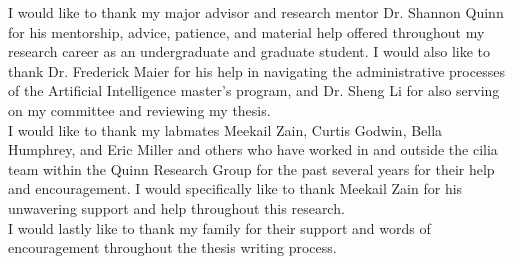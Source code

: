 \documentclass[./dissertation.tex]{subfiles}
\begin{document}
  
  I would like to thank my major advisor and research mentor Dr. Shannon Quinn for his mentorship, advice, patience, and material help offered throughout my research career as an undergraduate and graduate student. I would also like to thank Dr. Frederick Maier for his help in navigating the administrative processes of the Artificial Intelligence master's program, and Dr. Sheng Li for also serving on my committee and reviewing my thesis. \\
  
  I would like to thank my labmates Meekail Zain, Curtis Godwin, Bella Humphrey, and Eric Miller and others who have worked in and outside the cilia team within the Quinn Research Group for the past several years for their help and encouragement. I would specifically like to thank Meekail Zain for his unwavering support and help throughout this research. \\
  
  I would lastly like to thank my family for their support and words of encouragement throughout the thesis writing process. 
\end{document}
